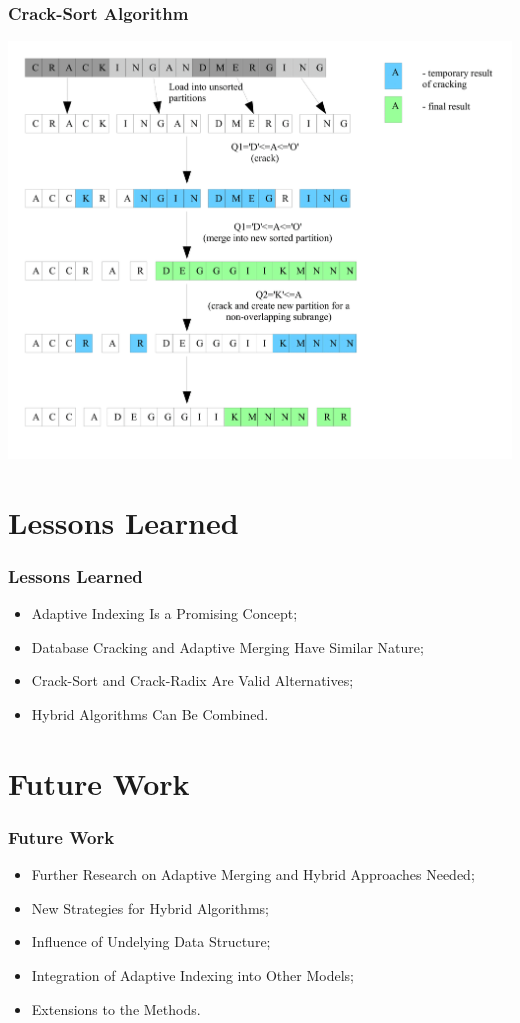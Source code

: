 \documentclass{beamer}
\begin{document}
\begin{frame}
\frametitle{Crack-Sort Algorithm}
\centering
\includegraphics[height=0.9\textheight , keepaspectratio]{graphics/hcs.png}
\end{frame}


\section{Lessons Learned}
\begin{frame}
\frametitle{Lessons Learned}
\begin{itemize}
\item{Adaptive Indexing Is a Promising Concept;}
\item{Database Cracking and Adaptive Merging Have Similar Nature;}
\item{Crack-Sort and Crack-Radix Are Valid Alternatives;}
\item{Hybrid Algorithms Can Be Combined.}
\end{itemize}
\end{frame}

\section{Future Work}
\begin{frame}
\frametitle{Future Work}
\begin{itemize}
\item{Further Research on Adaptive Merging and Hybrid Approaches Needed;}
\item{New Strategies for Hybrid Algorithms;}
\item{Influence of Undelying Data Structure;}
\item{Integration of Adaptive Indexing into Other Models;}
\item{Extensions to the Methods.}
\end{itemize}
\end{frame}
\end{document}
